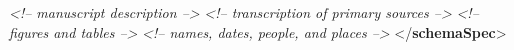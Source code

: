 \begin{shaded}
\mbox{}\newline 
\textit{<!-- manuscript description -->}\mbox{}\newline 
{}\mbox{}\newline 
\textit{<!-- transcription of primary sources -->}\mbox{}\newline 
{}\mbox{}\newline 
\textit{<!-- figures and tables -->}\mbox{}\newline 
{}\mbox{}\newline 
\textit{<!-- names, dates, people, and places -->}\mbox{}\newline 
{</\textbf{schemaSpec}>}\end{shaded}\egroup\par \par
